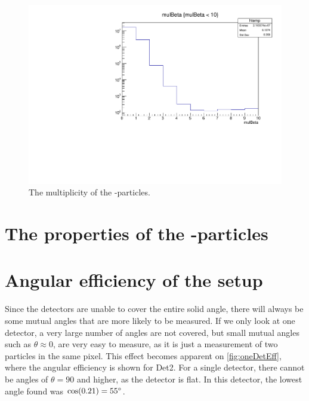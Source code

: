 \begin{figure}[h]
	\includegraphics[width=\linewidth]{../figures/mulBeta.pdf}
	\caption{The multiplicity of the \be-particles.}
	\label{fig:mulBeta}
\end{figure}

\section{The properties of the \al-particles}


\section{Angular efficiency of the setup}
Since the detectors are unable to cover the entire solid angle, there will always be some mutual angles that are more likely to be measured. 
If we only look at one detector, a very large number of angles are not covered, but small mutual angles such as $\theta \approx 0$, are very easy to measure, as it is just a measurement of two particles in the same pixel. 
This effect becomes apparent on \cref{fig:oneDetEff}, where the angular efficiency is shown for Det2. For a single detector, there cannot be angles of $\theta = 90$ and higher, as the detector is flat. In this detector, the lowest angle found was $\cos(0.21) = 55\degree$.\\


